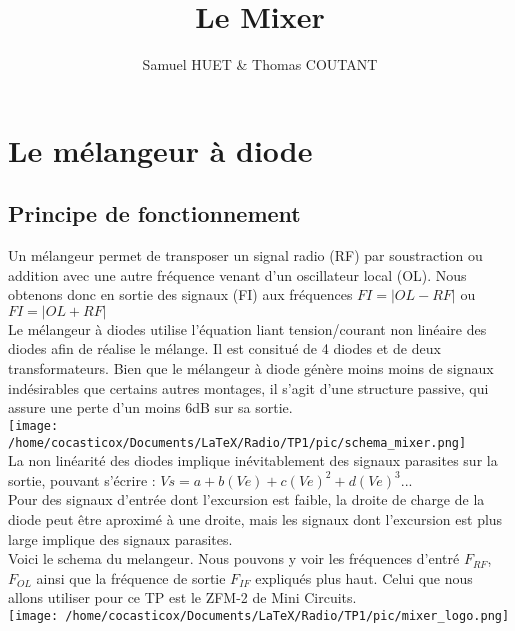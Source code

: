 \documentclass[a4paper,12pt]{report}            %
\author{Samuel HUET \& Thomas COUTANT}
\title{\huge{Le Mixer}}
\begin{document}
\maketitle
\renewcommand{\contentsname}{SOMMAIRE} %
\tableofcontents

\chapter{Le mélangeur à diode}

\section{Principe de fonctionnement}
    Un mélangeur permet de transposer un signal radio (RF) par soustraction ou addition avec
une autre fréquence venant d'un oscillateur local (OL). Nous obtenons donc en sortie des
signaux (FI) aux fréquences $FI = |OL - RF|$ ou $FI = |OL + RF|$\\
    Le mélangeur à diodes utilise l'équation liant tension/courant non linéaire
des diodes afin de réalise le mélange. Il est consitué de 4 diodes et de deux transformateurs.
Bien que le mélangeur à diode génère moins moins de signaux indésirables que certains autres montages,
il s'agit d'une structure passive, qui assure une perte d'un moins 6dB sur sa sortie.\\
\texttt{[image: /home/cocasticox/Documents/LaTeX/Radio/TP1/pic/schema\_mixer.png]}\\
    La non linéarité des diodes implique inévitablement des signaux parasites sur la sortie,
pouvant s'écrire : $Vs = a + b(Ve) + c(Ve)^{2} + d(Ve)^{3} ...$\\
    Pour des signaux d'entrée dont l'excursion est faible, la  droite de charge de la diode peut 
être aproximé à une droite, mais les signaux dont l'excursion est plus large implique des signaux parasites.\\
    Voici le schema du melangeur. Nous pouvons y voir les fréquences d'entré $F_{RF}$, $F_{OL}$ ainsi que la
fréquence de sortie $F_{IF}$ expliqués plus haut. Celui que nous allons utiliser pour ce TP est le ZFM-2 de Mini Circuits.\\
\texttt{[image: /home/cocasticox/Documents/LaTeX/Radio/TP1/pic/mixer\_logo.png]}\\
\end{document}
